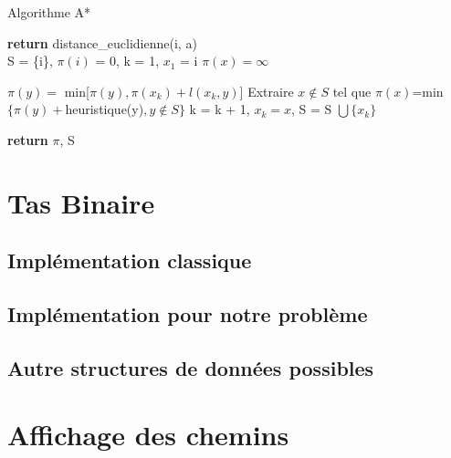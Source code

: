 \documentclass{article}
\begin{document}
\begin{algorithm}
\caption{Algorithme A*}\label{astar}
\begin{algorithmic}[1]
 
	\State \textbf{return} distance\_euclidienne(i, a)
\EndProcedure
\\
	\State S = \{i\}, $\pi(i)$ = 0, k = 1, $x_1$ = i
		\State $\pi(x) = \infty$
	\EndFor
	
			\State $\pi(y) = $ min[$\pi(y), \pi(x_k) + l(x_k, y)$]
		\EndFor
		\State Extraire $x \not\in S$ tel que $\pi(x)$=min$\{\pi(y)+$heuristique(y)$, y \not\in S\}$
		\State k = k + 1, $x_k = x$, S = S $\bigcup \{x_k\}$
	\EndWhile
	
	\State \textbf{return} $\pi$, S
\EndProcedure
\end{algorithmic}
\end{algorithm}

\pagebreak
\section{Tas Binaire}

\subsection{Implémentation classique}

\subsection{Implémentation pour notre problème}

\subsection{Autre structures de données possibles}

\pagebreak
\section{Affichage des chemins}
\end{document}

